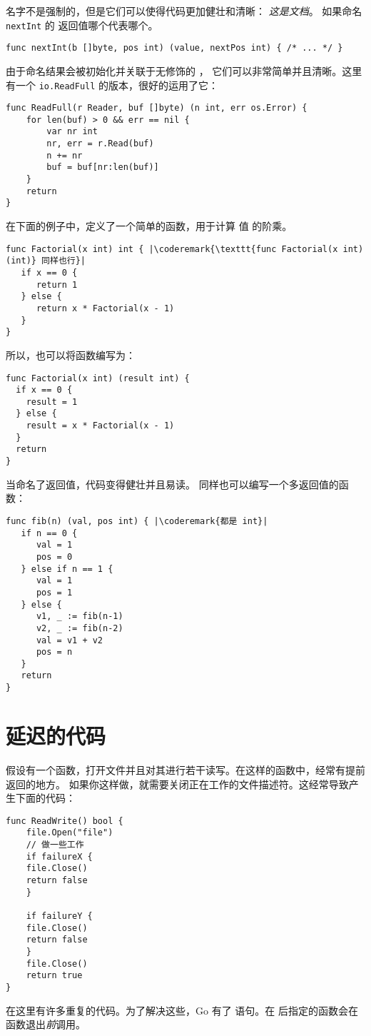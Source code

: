 名字不是强制的，但是它们可以使得代码更加健壮和清晰：
\emph{这是文档}。
如果命名 \lstinline{nextInt} 的  返回值哪个代表哪个。

\begin{lstlisting}
func nextInt(b []byte, pos int) (value, nextPos int) { /* ... */ }
\end{lstlisting}
由于命名结果会被初始化并关联于无修饰的 ，
它们可以非常简单并且清晰。这里有一个 \lstinline{io.ReadFull} 的版本，很好的运用了它：

\begin{lstlisting}
func ReadFull(r Reader, buf []byte) (n int, err os.Error) {
    for len(buf) > 0 && err == nil {
        var nr int
        nr, err = r.Read(buf)
        n += nr
        buf = buf[nr:len(buf)]
    }
    return
}
\end{lstlisting}
在下面的例子中，定义了一个简单的函数，用于计算
值  的阶乘。
\begin{lstlisting}
func Factorial(x int) int { |\coderemark{\texttt{func Factorial(x int) (int)} 同样也行}|
   if x == 0 {
      return 1
   } else {
      return x * Factorial(x - 1)
   }
}
\end{lstlisting}
所以，也可以将函数编写为：
\begin{lstlisting}
func Factorial(x int) (result int) {
  if x == 0 {
    result = 1	
  } else {
    result = x * Factorial(x - 1)
  }
  return
}
\end{lstlisting}
当命名了返回值，代码变得健壮并且易读。
同样也可以编写一个多返回值的函数：
\begin{lstlisting}
func fib(n) (val, pos int) { |\coderemark{都是 int}|
   if n == 0 {
      val = 1
      pos = 0
   } else if n == 1 {
      val = 1
      pos = 1
   } else {
      v1, _ := fib(n-1)
      v2, _ := fib(n-2)
      val = v1 + v2
      pos = n
   }
   return
}
\end{lstlisting}

\section{延迟的代码}
\label{sec:deferred code}
假设有一个函数，打开文件并且对其进行若干读写。在这样的函数中，经常有提前返回的地方。
如果你这样做，就需要关闭正在工作的文件描述符。这经常导致产生下面的代码：
\begin{lstlisting}[caption=没有 defer]
func ReadWrite() bool {
    file.Open("file")
    // 做一些工作
    if failureX {
	file.Close()
	return false
    }

    if failureY {
	file.Close()
	return false
    }
    file.Close()
    return true
}
\end{lstlisting}
在这里有许多重复的代码。为了解决这些，Go 有了
 语句。在 
后指定的函数会在函数退出\emph{前}调用。

